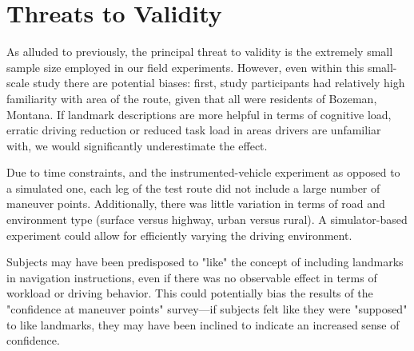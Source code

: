 \section{Threats to Validity}

As alluded to previously, the principal threat to validity is the extremely small sample size employed in our field experiments. However, even within this small-scale study there are potential biases: first, study participants had relatively high familiarity with area of the route, given that all were residents of Bozeman, Montana. If landmark descriptions are more helpful in terms of cognitive load, erratic driving reduction or reduced task load in areas drivers are unfamiliar with, we would significantly underestimate the effect.

Due to time constraints, and the instrumented-vehicle experiment as opposed to a simulated one, each leg of the test route did not include a large number of maneuver points. Additionally, there was little variation in terms of road and environment type (surface versus highway, urban versus rural). A simulator-based experiment could allow for efficiently varying the driving environment.

Subjects may have been predisposed to "like" the concept of including landmarks in navigation instructions, even if there was no observable effect in terms of workload or driving behavior. This could potentially bias the results of the "confidence at maneuver points" survey---if subjects felt like they were "supposed" to like landmarks, they may have been inclined to indicate an increased sense of confidence.